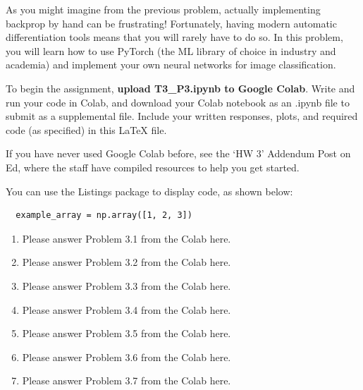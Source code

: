 \documentclass[submit]{harvardml}
\begin{document}
\newpage


\begin{problem}

  As you might imagine from the previous problem, actually implementing
  backprop by hand can be frustrating!  Fortunately, having modern
  automatic differentiation tools means that you will rarely have to do
  so.  In this problem, you will learn how to use PyTorch (the ML library of choice in industry and academia) and implement your own neural networks for image classification.
  
  To begin the assignment, \textbf{upload T3\_P3.ipynb to Google Colab}.  Write and run your code in Colab, and download your Colab notebook as an .ipynb file to submit as a supplemental file. Include your written responses, plots, and required code (as specified) in this LaTeX file.  
  
  If you have never used Google Colab before, see the `HW 3' Addendum Post on Ed, where the staff have compiled resources to help you get started. 
  
  You can use the Listings package to display code, as shown below:
  
  \begin{lstlisting}
  example_array = np.array([1, 2, 3])
  \end{lstlisting}
  
  \begin{enumerate}
      \item Please answer Problem 3.1 from the Colab here.
      \item Please answer Problem 3.2 from the Colab here.
      \item Please answer Problem 3.3 from the Colab here.
      \item Please answer Problem 3.4 from the Colab here.
      \item Please answer Problem 3.5 from the Colab here.
      \item Please answer Problem 3.6 from the Colab here.
      \item Please answer Problem 3.7 from the Colab here.
  \end{enumerate}
  
\end{problem}

\newpage
\end{document}
